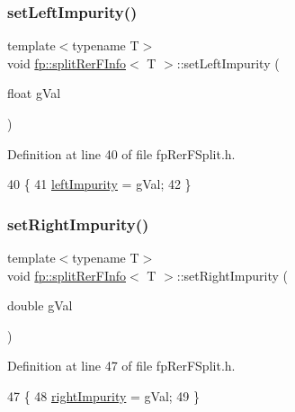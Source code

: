 \subsubsection{\texorpdfstring{set\+Left\+Impurity()}{setLeftImpurity()}}
{\footnotesize\ttfamily template$<$typename T$>$ \\
void \hyperlink{classfp_1_1splitRerFInfo}{fp\+::split\+Rer\+F\+Info}$<$ T $>$\+::set\+Left\+Impurity (\begin{DoxyParamCaption}\item[{float}]{g\+Val }\end{DoxyParamCaption})\hspace{0.3cm}{\ttfamily [inline]}}



Definition at line 40 of file fp\+Rer\+F\+Split.\+h.


\begin{DoxyCode}
40                                                        \{
41                     \hyperlink{classfp_1_1splitRerFInfo_a22a358c2d6a8105bf1af86ed2823d1d1}{leftImpurity} = gVal;
42                 \}
\end{DoxyCode}
\mbox{\label{classfp_1_1splitRerFInfo_a31171db1e7a89e0448668c03cd4adf7c}} 
\subsubsection{\texorpdfstring{set\+Right\+Impurity()}{setRightImpurity()}}
{\footnotesize\ttfamily template$<$typename T$>$ \\
void \hyperlink{classfp_1_1splitRerFInfo}{fp\+::split\+Rer\+F\+Info}$<$ T $>$\+::set\+Right\+Impurity (\begin{DoxyParamCaption}\item[{double}]{g\+Val }\end{DoxyParamCaption})\hspace{0.3cm}{\ttfamily [inline]}}



Definition at line 47 of file fp\+Rer\+F\+Split.\+h.


\begin{DoxyCode}
47                                                          \{
48                     \hyperlink{classfp_1_1splitRerFInfo_ae9c05e45d6da53a663393e4ff2a01c41}{rightImpurity} = gVal;
49                 \}
\end{DoxyCode}
\mbox{\label{classfp_1_1splitRerFInfo_a461777b91ece075a5a2123c348f4b4c4}} 
